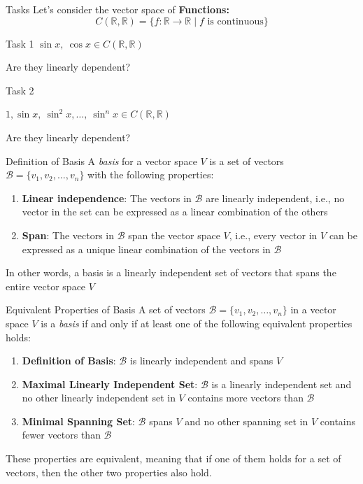 \documentclass[fullscreen=true, bookmarks=true, hyperref={pdfencoding=unicode}]{beamer}
\begin{document}
\begin{frame}{Tasks}
  Let's consider the vector space of \textbf{Functions:} $$C(\mathbb{R}, \mathbb{R}) = \{f: \mathbb{R} \to \mathbb{R} \mid f \text{ is continuous}\}$$

  \pause
  \begin{block}{Task 1}
    $\sin x,\ \cos x \in C(\mathbb{R}, \mathbb{R})$

    Are they linearly dependent?
  \end{block}

  \pause
  \begin{block}{Task 2}

    $1, \sin x,\ \sin^2 x, \hdots,\ \sin^n x \in C(\mathbb{R}, \mathbb{R})$

    Are they linearly dependent?
  \end{block}

\end{frame}


\begin{frame}{Definition of Basis}
  A \emph{basis} for a vector space $V$ is a set of vectors $\mathcal{B} = \{v_1, v_2, \ldots, v_n\}$ with the following properties:
  
  \begin{enumerate}
      \item \textbf{Linear independence}: The vectors in $\mathcal{B}$ are linearly independent, i.e., no vector in the set can be expressed as a linear combination of the others
      \item \textbf{Span}: The vectors in $\mathcal{B}$ span the vector space $V$, i.e., every vector in $V$ can be expressed as a unique linear combination of the vectors in $\mathcal{B}$
  \end{enumerate}
  
  In other words, a basis is a linearly independent set of vectors that spans the entire vector space $V$
\end{frame}


\begin{frame}{Equivalent Properties of Basis}
  A set of vectors $\mathcal{B} = \{v_1, v_2, \ldots, v_n\}$ in a 
  vector space $V$ is a \emph{basis} if and only if at least one 
  of the following equivalent properties holds:
  
  \begin{enumerate}
      \item \textbf{Definition of Basis}: $\mathcal{B}$ is linearly independent and spans $V$
      \item \textbf{Maximal Linearly Independent Set}: $\mathcal{B}$ is a linearly 
      independent set and no other linearly independent set in $V$ contains 
      more vectors than $\mathcal{B}$
      \item \textbf{Minimal Spanning Set}: $\mathcal{B}$ spans $V$ and 
      no other spanning set in $V$ contains fewer vectors than $\mathcal{B}$
  \end{enumerate}
  
  \vspace{0.5cm}\pause
  These properties are equivalent, meaning that if one of them holds for a set of vectors, then the other two properties also hold.
\end{frame}
\end{document}
